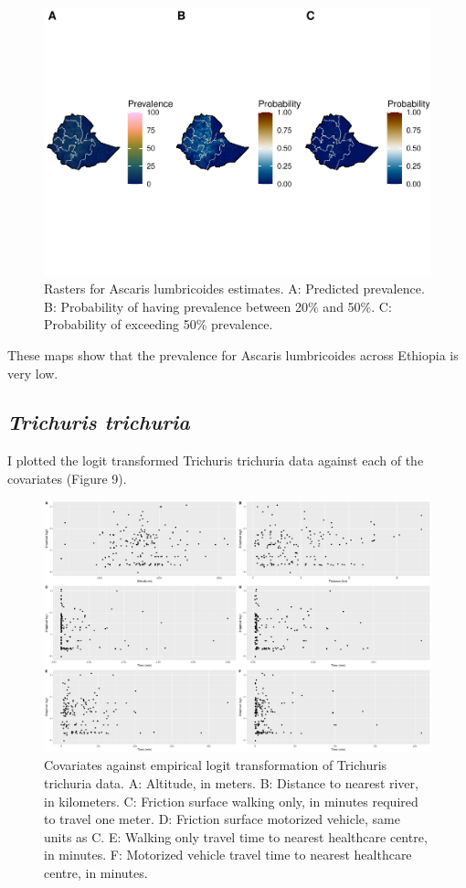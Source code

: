 \documentclass[
]{article}
\begin{document}
\begin{figure}
\centering
\includegraphics{write_up_files/figure-latex/Asc.prediction.rasters-1.pdf}
\caption{Rasters for Ascaris lumbricoides estimates. A: Predicted
prevalence. B: Probability of having prevalence between 20\% and 50\%.
C: Probability of exceeding 50\% prevalence.}
\end{figure}

These maps show that the prevalence for Ascaris lumbricoides across
Ethiopia is very low.

\hypertarget{trichuris-trichuria}{%
\subsection{\texorpdfstring{\emph{Trichuris
trichuria}}{Trichuris trichuria}}\label{trichuris-trichuria}}

I plotted the logit transformed Trichuris trichuria data against each of
the covariates (Figure 9).

\begin{figure}
\centering
\includegraphics{write_up_files/figure-latex/TT_e.logit-1.pdf}
\caption{Covariates against empirical logit transformation of Trichuris
trichuria data. A: Altitude, in meters. B: Distance to nearest river, in
kilometers. C: Friction surface walking only, in minutes required to
travel one meter. D: Friction surface motorized vehicle, same units as
C. E: Walking only travel time to nearest healthcare centre, in minutes.
F: Motorized vehicle travel time to nearest healthcare centre, in
minutes.}
\end{figure}
\end{document}
